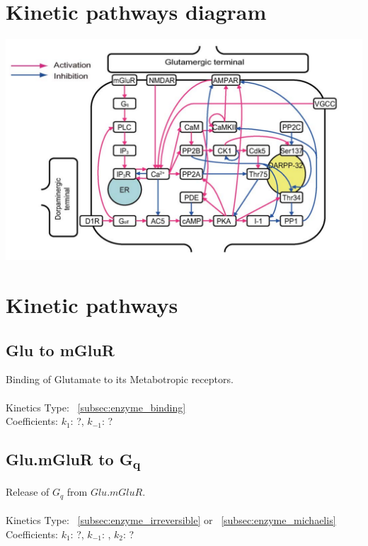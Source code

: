 \documentclass[twoside,twocolumn]{article}
\begin{document}
\section{Kinetic pathways diagram}


\begin{strip}
    \centering\noindent
    \includegraphics[width=\textwidth,natwidth=1132,natheight=701]{dopamine-kinetic-diagram.png}
\end{strip}

\section{Kinetic pathways}
\subsection{Glu to mGluR}
Binding of Glutamate to its Metabotropic receptors.
\\
\\Kinetics Type: ~\ref{subsec:enzyme_binding}
\\Coefficients: $k_{1}$: ?, $k_{-1}$: ? 

\subsection{Glu.mGluR to \texorpdfstring{G\textsubscript{q}}{Gq}}
Release of $G_{q}$ from $Glu.mGluR$.
\\
\\Kinetics Type: ~\ref{subsec:enzyme_irreversible} or ~\ref{subsec:enzyme_michaelis}
\\Coefficients: $k_{1}$: ?, $k_{-1}$: , $k_{2}$: ? 
\end{document}
